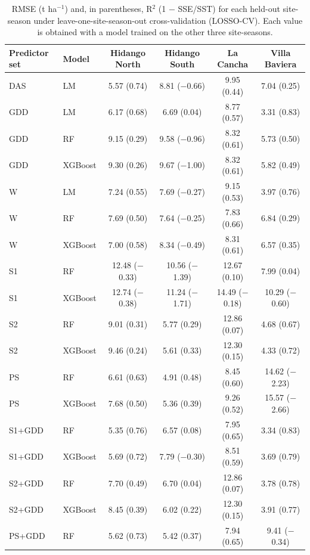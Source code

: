 \begin{table}[htbp]
\centering
\footnotesize
\caption{RMSE (t ha$^{-1}$) and, in parentheses, R$^2$ (1 $-$ SSE/SST) for each held-out site-season under leave-one-site-season-out cross-validation (LOSSO-CV). Each value is obtained with a model trained on the other three site-seasons.}
\label{tbl-s2}
\begin{tabular}{l l c c c c}
\toprule
\textbf{Predictor set} & \textbf{Model} & \textbf{Hidango North} & \textbf{Hidango South} & \textbf{La Cancha} & \textbf{Villa Baviera} \\
\midrule
DAS & LM & 5.57 (0.74) & 8.81 ($-$0.66) & 9.95 (0.44) & 7.04 (0.25) \\
GDD & LM & 6.17 (0.68) & 6.69 (0.04) & 8.77 (0.57) & 3.31 (0.83) \\
GDD & RF & 9.15 (0.29) & 9.58 ($-$0.96) & 8.32 (0.61) & 5.73 (0.50) \\
GDD & XGBoost & 9.30 (0.26) & 9.67 ($-$1.00) & 8.32 (0.61) & 5.82 (0.49) \\
W & LM & 7.24 (0.55) & 7.69 ($-$0.27) & 9.15 (0.53) & 3.97 (0.76) \\
W & RF & 7.69 (0.50) & 7.64 ($-$0.25) & 7.83 (0.66) & 6.84 (0.29) \\
W & XGBoost & 7.00 (0.58) & 8.34 ($-$0.49) & 8.31 (0.61) & 6.57 (0.35) \\
S1 & RF & 12.48 ($-$0.33) & 10.56 ($-$1.39) & 12.67 (0.10) & 7.99 (0.04) \\
S1 & XGBoost & 12.74 ($-$0.38) & 11.24 ($-$1.71) & 14.49 ($-$0.18) & 10.29 ($-$0.60) \\
S2 & RF & 9.01 (0.31) & 5.77 (0.29) & 12.86 (0.07) & 4.68 (0.67) \\
S2 & XGBoost & 9.46 (0.24) & 5.61 (0.33) & 12.30 (0.15) & 4.33 (0.72) \\
PS & RF & 6.61 (0.63) & 4.91 (0.48) & 8.45 (0.60) & 14.62 ($-$2.23) \\
PS & XGBoost & 7.68 (0.50) & 5.36 (0.39) & 9.26 (0.52) & 15.57 ($-$2.66) \\
S1+GDD & RF & 5.35 (0.76) & 6.57 (0.08) & 7.95 (0.65) & 3.34 (0.83) \\
S1+GDD & XGBoost & 5.69 (0.72) & 7.79 ($-$0.30) & 8.51 (0.59) & 3.69 (0.79) \\
S2+GDD & RF & 7.70 (0.49) & 6.70 (0.04) & 12.86 (0.07) & 3.78 (0.78) \\
S2+GDD & XGBoost & 8.45 (0.39) & 6.02 (0.22) & 12.30 (0.15) & 3.91 (0.77) \\
PS+GDD & RF & 5.62 (0.73) & 5.42 (0.37) & 7.94 (0.65) & 9.41 ($-$0.34) \\

\end{tabular}
\end{table}
